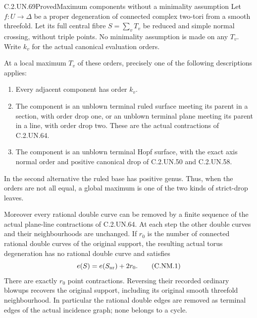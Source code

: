 \begin{statement}{C.2.UN.69}{Proved}{Maximum components without a minimality assumption}
Let $f:U\to\Delta$ be a proper degeneration of connected complex
two-tori from a smooth threefold. Let its full central fibre
$S=\sum_vT_v$ be reduced and simple normal crossing, without triple
points. No minimality assumption is made on any $T_v$.
Write $k_v$ for the actual canonical evaluation orders.

At a local maximum $T_v$ of these orders, precisely one of the
following descriptions applies:
\begin{enumerate}
\item Every adjacent component has order $k_v$.
\item The component is an unblown terminal ruled surface meeting
its parent in a section, with order drop one, or an unblown
terminal plane meeting its parent in a line, with order drop two.
These are the actual contractions of C.2.UN.64.
\item The component is an unblown terminal Hopf surface, with
the exact axis normal order and positive canonical drop of
C.2.UN.50 and C.2.UN.58.
\end{enumerate}
In the second alternative the ruled base has positive genus.
Thus, when the orders are not all equal, a global maximum is
one of the two kinds of strict-drop leaves.

Moreover every rational double curve can be removed by a finite
sequence of the actual plane-line contractions of C.2.UN.64.
At each step the other double curves and their neighbourhoods
are unchanged. If $r_0$ is the number of connected rational
double curves of the original support, the resulting actual
torus degeneration has no rational double curve and satisfies
\[
             e(S)=e(S_{\rm nr})+2r_0 .
\tag{C.NM.1}
\]
There are exactly $r_0$ point contractions. Reversing their
recorded ordinary blowups recovers the original support,
including its original smooth threefold neighbourhood.
In particular the rational double edges are removed as terminal
edges of the actual incidence graph; none belongs to a cycle.
\end{statement}

